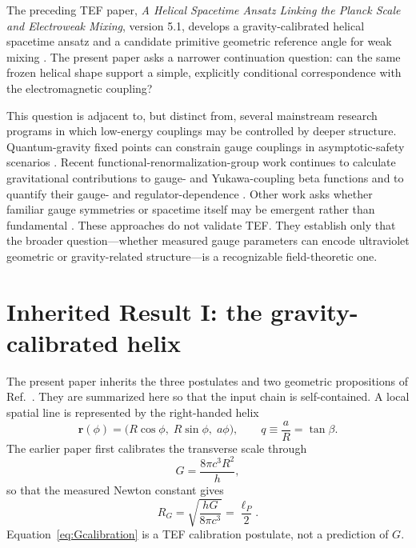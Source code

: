 \documentclass[10pt,twocolumn]{article}
\begin{document}
The preceding TEF paper, \emph{A Helical Spacetime Ansatz Linking the Planck Scale and
Electroweak Mixing}, version 5.1, develops a gravity-calibrated helical spacetime ansatz and a
candidate primitive geometric reference angle for weak mixing \cite{WuCompanion}.  The present
paper asks a narrower continuation question: can the same frozen helical shape support a simple,
explicitly conditional correspondence with the electromagnetic coupling?

This question is adjacent to, but distinct from, several mainstream research programs in which
low-energy couplings may be controlled by deeper structure.  Quantum-gravity fixed points can
constrain gauge couplings in asymptotic-safety scenarios \cite{EichhornHeldWetterich}.  Recent
functional-renormalization-group work continues to calculate gravitational contributions to gauge-
and Yukawa-coupling beta functions and to quantify their gauge- and regulator-dependence
\cite{Giacometti2026}.  Other work asks whether familiar gauge symmetries or spacetime itself may
be emergent rather than fundamental \cite{Bass2026,Addazi2024,Addazi2025}.  These approaches do
not validate TEF.  They establish only that the broader question---whether measured gauge parameters
can encode ultraviolet geometric or gravity-related structure---is a recognizable field-theoretic one.

\section{Inherited Result I: the gravity-calibrated helix}
\label{sec:inherited}

The present paper inherits the three postulates and two geometric propositions of
Ref.~\cite{WuCompanion}.  They are summarized here so that the input chain is self-contained.
A local spatial line is represented by the right-handed helix
\begin{equation}
\bm r(\phi)=\bigl(R\cos\phi,\;R\sin\phi,\;a\phi\bigr),
\qquad
q\equiv\frac{a}{R}=\tan\beta.
\label{eq:helix}
\end{equation}
The earlier paper first calibrates the transverse scale through
\begin{equation}
G=\frac{8\pi c^3R^2}{h},
\label{eq:Gcalibration}
\end{equation}
so that the measured Newton constant gives
\begin{equation}
R_G=\sqrt{\frac{hG}{8\pi c^3}}=\frac{\ell_P}{2}.
\label{eq:RG}
\end{equation}
Equation~\eqref{eq:Gcalibration} is a TEF calibration postulate, not a prediction of $G$.
\end{document}
